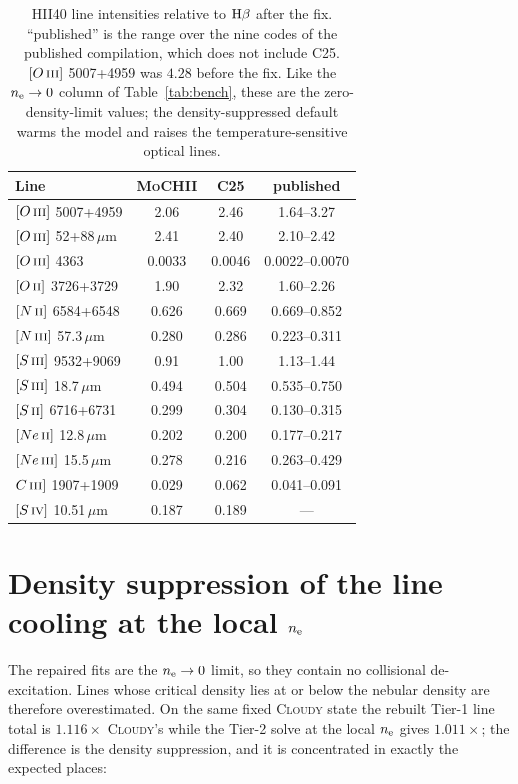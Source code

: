 \documentclass[english,a4paper]{my_memo}
\newcommand{\MoCHII}{\textsc{MoCHII}}
\newcommand{\Cloudy}{\textsc{Cloudy}}
\newcommand{\OII}{O\,\textsc{ii}}
\newcommand{\OIII}{O\,\textsc{iii}}
\newcommand{\NII}{N\,\textsc{ii}}
\newcommand{\NIII}{N\,\textsc{iii}}
\newcommand{\CIII}{C\,\textsc{iii}}
\newcommand{\SII}{S\,\textsc{ii}}
\newcommand{\SIII}{S\,\textsc{iii}}
\newcommand{\SIV}{S\,\textsc{iv}}
\newcommand{\NeII}{Ne\,\textsc{ii}}
\newcommand{\NeIII}{Ne\,\textsc{iii}}
\newcommand{\nel}{n_{\rm e}}
\begin{document}
\begin{table}[htbp]
\centering
\caption{HII40 line intensities relative to ${\rm H}\beta$ after the fix.
``published'' is the range over the nine codes of the published compilation,
which does not include C25.
$[\OIII{}]$ 5007+4959 was $4.28$ before the fix.  Like the $\nel \to 0$ column
of Table~\ref{tab:bench}, these are the zero-density-limit values; the
density-suppressed default warms the model and raises the
temperature-sensitive optical lines.}
\label{tab:lines}
\begin{tabular}{lccc}
\toprule
Line & \MoCHII{} & C25 & published \\
\midrule
$[\OIII{}]$ 5007+4959       & 2.06   & 2.46   & 1.64--3.27 \\
$[\OIII{}]$ 52+88\,$\mu$m   & 2.41   & 2.40   & 2.10--2.42 \\
$[\OIII{}]$ 4363            & 0.0033 & 0.0046 & 0.0022--0.0070 \\
$[\OII{}]$ 3726+3729        & 1.90   & 2.32   & 1.60--2.26 \\
$[\NII{}]$ 6584+6548        & 0.626  & 0.669  & 0.669--0.852 \\
$[\NIII{}]$ 57.3\,$\mu$m    & 0.280  & 0.286  & 0.223--0.311 \\
$[\SIII{}]$ 9532+9069       & 0.91   & 1.00   & 1.13--1.44 \\
$[\SIII{}]$ 18.7\,$\mu$m    & 0.494  & 0.504  & 0.535--0.750 \\
$[\SII{}]$ 6716+6731        & 0.299  & 0.304  & 0.130--0.315 \\
$[\NeII{}]$ 12.8\,$\mu$m    & 0.202  & 0.200  & 0.177--0.217 \\
$[\NeIII{}]$ 15.5\,$\mu$m   & 0.278  & 0.216  & 0.263--0.429 \\
$\CIII{}]$ 1907+1909        & 0.029  & 0.062  & 0.041--0.091 \\
$[\SIV{}]$ 10.51\,$\mu$m    & 0.187  & 0.189  & --- \\
\bottomrule
\end{tabular}
\end{table}

\section{Density suppression of the line cooling at the local $\nel$}
\label{sec:limit}

The repaired fits are the $\nel \to 0$ limit, so they contain no collisional
de-excitation.  Lines whose critical density lies at or below the nebular
density are therefore overestimated.  On the same fixed \Cloudy{} state the
rebuilt Tier-1 line total is $1.116\times$ \Cloudy{}'s while the Tier-2 solve
at the local $\nel$ gives $1.011\times$; the difference is the density
suppression, and it is concentrated in exactly the expected places:
\end{document}
